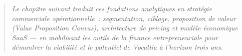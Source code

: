 \begin{quote}
\textit{Le chapitre suivant traduit ces fondations analytiques en stratégie commerciale opérationnelle~: segmentation, ciblage, proposition de valeur (Value Proposition Canvas), architecture de pricing et modèle économique SaaS --- en mobilisant les outils de la finance entrepreneuriale pour démontrer la viabilité et le potentiel de Vocallia à l'horizon trois ans.}
\end{quote}